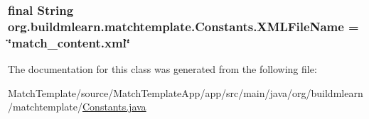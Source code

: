 \subsubsection[{\texorpdfstring{X\+M\+L\+File\+Name}{XMLFileName}}]{\setlength{\rightskip}{0pt plus 5cm}final String org.\+buildmlearn.\+matchtemplate.\+Constants.\+X\+M\+L\+File\+Name = \char`\"{}match\+\_\+content.\+xml\char`\"{}\hspace{0.3cm}{\ttfamily [static]}}\hypertarget{classorg_1_1buildmlearn_1_1matchtemplate_1_1Constants_a5f09a87abe3a26abff569523bb844890}{}\label{classorg_1_1buildmlearn_1_1matchtemplate_1_1Constants_a5f09a87abe3a26abff569523bb844890}


The documentation for this class was generated from the following file\+:\begin{DoxyCompactItemize}
\item 
Match\+Template/source/\+Match\+Template\+App/app/src/main/java/org/buildmlearn/matchtemplate/\hyperlink{MatchTemplate_2source_2MatchTemplateApp_2app_2src_2main_2java_2org_2buildmlearn_2matchtemplate_2Constants_8java}{Constants.\+java}\end{DoxyCompactItemize}
